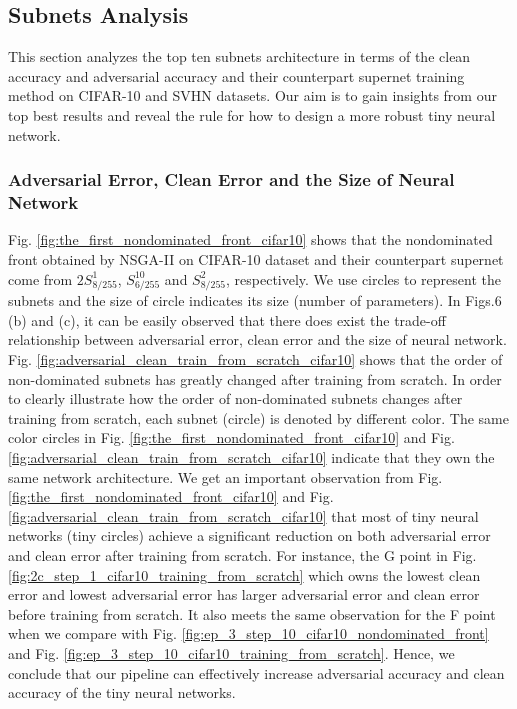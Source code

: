 \documentclass[journal]{IEEEtran}
\begin{document}
\subsection{\textbf{Subnets Analysis}}
This section analyzes the top ten subnets architecture in terms of the clean accuracy and adversarial accuracy and their counterpart supernet training method on CIFAR-10 and SVHN datasets. Our aim is to gain insights from our top best results and reveal the rule for how to design a more robust tiny neural network.
\subsubsection{\textbf{Adversarial Error, Clean Error and the Size of Neural Network}}
Fig. \ref{fig:the_first_nondominated_front_cifar10} shows that the nondominated front obtained by NSGA-II on CIFAR-10 dataset and their counterpart supernet come from $2S_{8/255}^{1}$, $S_{6/255}^{10}$ and $S_{8/255}^{2}$, respectively. We use circles to represent the subnets and the size of circle indicates its size (number of parameters). In Figs.6 (b) and (c), it can be easily observed that there does exist the trade-off relationship between adversarial error, clean error and the size of neural network. Fig. \ref{fig:adversarial_clean_train_from_scratch_cifar10} shows that the order of non-dominated subnets has greatly changed after training from scratch. In order to clearly illustrate how the order of non-dominated subnets changes after training from scratch, each subnet (circle) is denoted by different color. The same color circles in Fig. \ref{fig:the_first_nondominated_front_cifar10} and Fig. \ref{fig:adversarial_clean_train_from_scratch_cifar10} indicate that they own the same network architecture. We get an important observation from Fig. \ref{fig:the_first_nondominated_front_cifar10} and Fig. \ref{fig:adversarial_clean_train_from_scratch_cifar10} that most of tiny neural networks (tiny circles) achieve a significant reduction on both adversarial error and clean error after training from scratch. For instance, the G point in Fig. \ref{fig:2c_step_1_cifar10_training_from_scratch} which owns the lowest clean error and lowest adversarial error has larger adversarial error and clean error before training from scratch. It also meets the same observation for the F point when we compare with Fig. \ref{fig:ep_3_step_10_cifar10_nondominated_front} and Fig. \ref{fig:ep_3_step_10_cifar10_training_from_scratch}. Hence, we conclude that our pipeline can effectively increase adversarial accuracy and clean accuracy of the tiny neural networks.
\end{document}
